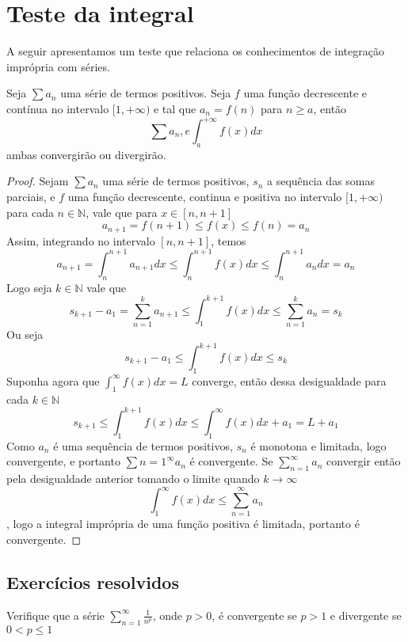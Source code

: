 \section{Teste da integral}
\construirSec

A seguir apresentamos um teste que relaciona os conhecimentos de integração
imprópria com séries.

\begin{teo}
    Seja $\sum a_n$ uma série de termos positivos. Seja $f$ uma função
    decrescente e contínua no intervalo $[1, +\infty)$ e tal que 
    $a_n = f(n)$ para $n \geq a$, então
    $$\sum a_n, e \int_a^{+\infty} f(x) dx $$
    ambas convergirão ou divergirão. 
\end{teo}

\begin{proof}
    Sejam $\sum a_n$ uma série de termos positivos, $s_n$ a sequência das somas
    parciais, e $f$ uma função decrescente, continua e positiva no intervalo
    $[1, +\infty)$ para cada $n \in \mathbb{N}$, vale que para $x \in [n, n+1]$
    $$a_{n+1} = f(n+1) \leq f(x) \leq f(n) = a_{n} $$
    Assim, integrando no intervalo $[n,n+1]$, temos
    $$a_{n+1} = \int_n^{n+1} a_{n+1} dx \leq \int_n^{n+1} f(x) dx \leq 
    \int_n^{n+1} a_{n} dx = a_{n} $$
    Logo seja $k \in \mathbb{N}$ vale que
    $$s_{k+1} - a_1 = \sum_{n = 1}^k a_{n+1} \leq \int_1^{k+1} f(x) dx\leq 
    \sum_{n = 1}^k a_{n} = s_k$$
    Ou seja
    $$s_{k+1} - a_1 \leq \int_{1}^{k+1}f(x) dx \leq s_{k}$$
    Suponha agora que $\int_{1}^{\infty} f(x) dx = L$ converge, então dessa 
    desigualdade para cada $k \in \mathbb{N}$
    $$s_{k+1} \leq \int_{1}^{k+1}f(x) dx \leq \int_{1}^{\infty} f(x) dx + a_1 =L + a_1$$
    Como $a_n$ é uma sequência de termos positivos, $s_n$ é monotona e limitada,
    logo convergente, e portanto $\sum{n=1}^{\infty} a_n$ é convergente.
    Se $\sum_{n=1}^{\infty} a_n$ convergir então pela desigualdade anterior
    tomando o limite quando $k \to \infty$
    $$\int_{1}^{\infty} f(x) dx \leq \sum_{n=1}^{\infty} a_n$$,
    logo a integral imprópria de uma função positiva é limitada, portanto é
    convergente.
\end{proof}
\subsection*{Exercícios resolvidos}

\construirExeresol
\begin{exeresol}
    Verifique que a série $\sum_{n = 1}^{\infty} \frac{1}{n^p}$, onde $p>0$, é
    convergente se $p>1$ e divergente se $0 < p \leq 1$ 
\end{exeresol}

